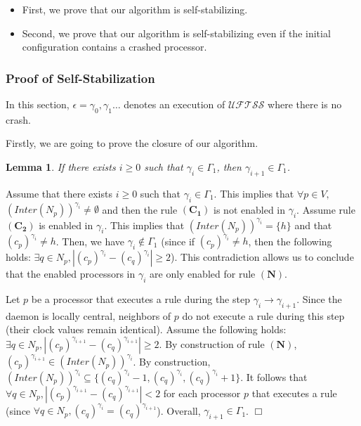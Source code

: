 \documentclass[11pt,english,letterpaper]{article}
\newtheorem{lemma}{Lemma}
\newenvironment{proof}{{\noindent\bf Proof. } }{{\hfill $\Box$}}
\begin{document}
\begin{itemize}
\item First, we prove that our algorithm is self-stabilizing.
\item Second, we  prove that our algorithm is self-stabilizing even if the initial configuration contains a crashed processor.
\end{itemize}

\subsubsection{Proof of Self-Stabilization}

In this section, $\epsilon=\gamma_{0},\gamma_{1}\ldots$ denotes an execution of $\mathcal{UFTSS}$ where there is no crash.

Firstly, we are going to prove the closure of our algorithm.

\begin{lemma}\label{lem:clotureChaine}
If there exists $i\geq 0$ such that $\gamma_{i}\in \Gamma_{1}$, then $\gamma_{i+1}\in\Gamma_{1}$.
\end{lemma}

\begin{proof}
Assume that there exists $i\geq 0$ such that $\gamma_{i}\in \Gamma_{1}$. This implies that $\forall p\in V,$ $\left(Inter(N_{p})\right)^{\gamma_{i}}\neq\emptyset$ and then the rule $\boldsymbol{(C_{1})}$ is not enabled in $\gamma_{i}$. Assume rule $\boldsymbol{(C_{2})}$ is enabled in $\gamma_{i}$. This implies that $\left(Inter(N_{p})\right)^{\gamma_{i}}=\{h\}$ and that $\left(c_{p}\right)^{\gamma_{i}}\neq h$. Then, we have $\gamma_{i}\notin \Gamma_{1}$ (since if $\left(c_{p}\right)^{\gamma_{i}}\neq h$, then the following holds: $\exists q\in N_{p},|\left(c_{p}\right)^{\gamma_{i}}-\left(c_{q}\right)^{\gamma_{i}}|\geq 2$). This contradiction allows us to conclude that the enabled processors in $\gamma_{i}$ are only enabled for rule $\boldsymbol{(N)}$.

Let $p$ be a processor that executes a rule during the step $\gamma_{i}\rightarrow\gamma_{i+1}$. Since the daemon is locally central, neighbors of $p$ do not execute a rule during this step (their clock values remain identical). Assume the following holds: $\exists q\in N_{p}, |\left(c_{p}\right)^{\gamma_{i+1}}-\left(c_{q}\right)^{\gamma_{i+1}}|\geq 2$. By construction of rule $\boldsymbol{(N)}$, $\left(c_{p}\right)^{\gamma_{i+1}}\in\left(Inter(N_{p})\right)^{\gamma_{i}}$. By construction, $\left(Inter(N_{p})\right)^{\gamma_{i}}\subseteq \{\left(c_{q}\right)^{\gamma_{i}}-1,\left(c_{q}\right)^{\gamma_{i}},\left(c_{q}\right)^{\gamma_{i}}+1\}$. It follows that $\forall q\in N_{p},|\left(c_{p}\right)^{\gamma_{i+1}}-\left(c_{q}\right)^{\gamma_{i+1}}|< 2$ for each processor $p$ that executes a rule (since $\forall q\in N_{p},\left(c_{q}\right)^{\gamma_{i}}=\left(c_{q}\right)^{\gamma_{i+1}}$). Overall, $\gamma_{i+1}\in \Gamma_{1}$.
\end{proof}
\end{document}
